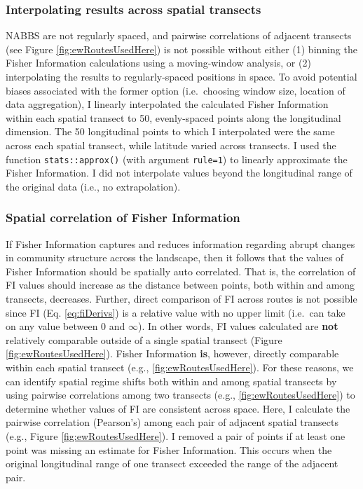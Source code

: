 \documentclass[12pt,twoside,openany]{reedthesis}
\begin{document}
\hypertarget{interpolating-results-across-spatial-transects}{%
\subsubsection{Interpolating results across spatial transects}\label{interpolating-results-across-spatial-transects}}

NABBS are not regularly spaced, and pairwise correlations of adjacent transects (see Figure \ref{fig:ewRoutesUsedHere}) is not possible without either (1) binning the Fisher Information calculations using a moving-window analysis, or (2) interpolating the results to regularly-spaced positions in space. To avoid potential biases associated with the former option (i.e.~choosing window size, location of data aggregation), I linearly interpolated the calculated Fisher Information within each spatial transect to 50, evenly-spaced points along the longitudinal dimension. The 50 longitudinal points to which I interpolated were the same across each spatial transect, while latitude varied across transects. I used the function \texttt{stats::approx()} (with argument \texttt{rule=1}) to linearly approximate the Fisher Information. I did not interpolate values beyond the longitudinal range of the original data (i.e., no extrapolation).

\hypertarget{spatial-correlation-of-fisher-information}{%
\subsubsection{Spatial correlation of Fisher Information}\label{spatial-correlation-of-fisher-information}}

If Fisher Information captures and reduces information regarding abrupt changes in community structure across the landscape, then it follows that the values of Fisher Information should be spatially auto correlated. That is, the correlation of FI values should increase as the distance between points, both within and among transects, decreases. Further, direct comparison of FI across routes is not possible since FI (Eq. \eqref{eq:fiDerivs}) is a relative value with no upper limit (i.e.~can take on any value between \(0\) and \(\infty\)). In other words, FI values calculated are \textbf{not} relatively comparable outside of a single spatial transect (Figure \ref{fig:ewRoutesUsedHere}). Fisher Information \textbf{is}, however, directly comparable within each spatial transect (e.g., \ref{fig:ewRoutesUsedHere}). For these reasons, we can identify spatial regime shifts both within and among spatial transects by using pairwise correlations among two transects (e.g., \ref{fig:ewRoutesUsedHere}) to determine whether values of FI are consistent across space. Here, I calculate the pairwise correlation (Pearson's) among each pair of adjacent spatial transects (e.g., Figure \ref{fig:ewRoutesUsedHere}). I removed a pair of points if at least one point was missing an estimate for Fisher Information. This occurs when the original longitudinal range of one transect exceeded the range of the adjacent pair.
\end{document}
